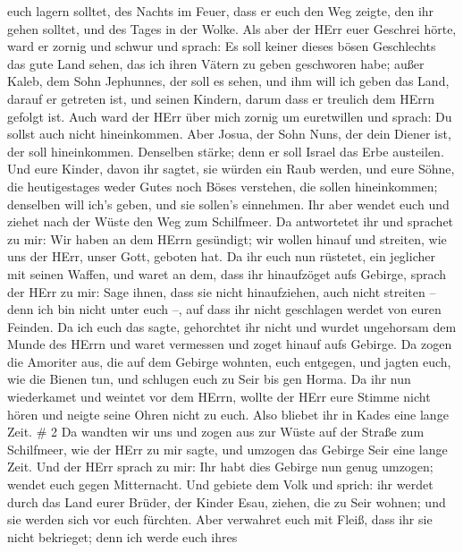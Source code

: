 euch lagern solltet, des Nachts im Feuer, dass er euch den Weg zeigte,
den ihr gehen solltet, und des Tages in der Wolke.  Als
aber der HErr euer Geschrei hörte, ward er zornig und schwur und sprach:
 Es soll keiner dieses bösen Geschlechts das gute Land
sehen, das ich ihren Vätern zu geben geschworen habe; 
außer Kaleb, dem Sohn Jephunnes, der soll es sehen, und ihm will ich
geben das Land, darauf er getreten ist, und seinen Kindern, darum dass
er treulich dem HErrn gefolgt ist.  Auch ward der HErr über
mich zornig um euretwillen und sprach: Du sollst auch nicht
hineinkommen.  Aber Josua, der Sohn Nuns, der dein Diener
ist, der soll hineinkommen. Denselben stärke; denn er soll Israel das
Erbe austeilen.  Und eure Kinder, davon ihr sagtet, sie
würden ein Raub werden, und eure Söhne, die heutigestages weder Gutes
noch Böses verstehen, die sollen hineinkommen; denselben will ich's
geben, und sie sollen's einnehmen.  Ihr aber wendet euch
und ziehet nach der Wüste den Weg zum Schilfmeer.  Da
antwortetet ihr und sprachet zu mir: Wir haben an dem HErrn gesündigt;
wir wollen hinauf und streiten, wie uns der HErr, unser Gott, geboten
hat. Da ihr euch nun rüstetet, ein jeglicher mit seinen Waffen, und
waret an dem, dass ihr hinaufzöget aufs Gebirge,  sprach
der HErr zu mir: Sage ihnen, dass sie nicht hinaufziehen, auch nicht
streiten -- denn ich bin nicht unter euch --, auf dass ihr nicht
geschlagen werdet von euren Feinden.  Da ich euch das
sagte, gehorchtet ihr nicht und wurdet ungehorsam dem Munde des HErrn
und waret vermessen und zoget hinauf aufs Gebirge.  Da
zogen die Amoriter aus, die auf dem Gebirge wohnten, euch entgegen, und
jagten euch, wie die Bienen tun, und schlugen euch zu Seir bis gen
Horma.  Da ihr nun wiederkamet und weintet vor dem HErrn,
wollte der HErr eure Stimme nicht hören und neigte seine Ohren nicht zu
euch.  Also bliebet ihr in Kades eine lange Zeit. \# 2
 Da wandten wir uns und zogen aus zur Wüste auf der Straße
zum Schilfmeer, wie der HErr zu mir sagte, und umzogen das Gebirge Seir
eine lange Zeit.  Und der HErr sprach zu mir: 
Ihr habt dies Gebirge nun genug umzogen; wendet euch gegen Mitternacht.
 Und gebiete dem Volk und sprich: ihr werdet durch das Land
eurer Brüder, der Kinder Esau, ziehen, die zu Seir wohnen; und sie
werden sich vor euch fürchten. Aber verwahret euch mit Fleiß,
 dass ihr sie nicht bekrieget; denn ich werde euch ihres
